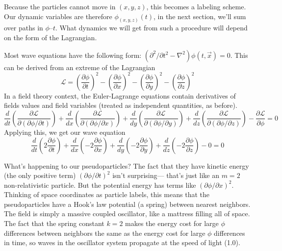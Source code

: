 \documentclass[12pt]{article}
\begin{document}
Because the particles cannot move in $(x,y,z)$, this becomes a
labeling scheme.  Our dynamic variables are therefore
$\phi_{(x,y,z)}(t)$, in the next section, we'll sum over paths in
$\phi$--$t$.  What dynamics we will get from such a procedure will
depend on the form of the Lagrangian.

Most wave equations have the following form: $(\partial^2/\partial t^2
- \nabla^2) \phi(t,\vec{x}) = 0$.  This can be derived from an extreme
of the Lagrangian
\begin{equation}
  \mathcal{L} = \left( \frac{\partial \phi}{\partial t} \right)^2 -
  \left( \frac{\partial \phi}{\partial x} \right)^2 - \left(
  \frac{\partial \phi}{\partial y} \right)^2 - \left( \frac{\partial
  \phi}{\partial z} \right)^2
\end{equation}
In a field theory context, the Euler-Lagrange equations contain
derivatives of fields values and field variables (treated as
independent quantities, as before).
\begin{equation}
  \frac{d}{dt} \left( \frac{\partial \mathcal{L}}{\partial (\partial \phi / \partial t)} \right) +
  \frac{d}{dx} \left( \frac{\partial \mathcal{L}}{\partial (\partial \phi / \partial x)} \right) +
  \frac{d}{dy} \left( \frac{\partial \mathcal{L}}{\partial (\partial \phi / \partial y)} \right) +
  \frac{d}{dz} \left( \frac{\partial \mathcal{L}}{\partial (\partial \phi / \partial z)} \right) -
  \frac{\partial \mathcal{L}}{\partial \phi} = 0
\end{equation}
Applying this, we get our wave equation
\begin{equation}
  \frac{d}{dt} \left(2 \frac{\partial \phi}{\partial t} \right) +
  \frac{d}{dx} \left(-2 \frac{\partial \phi}{\partial x} \right) +
  \frac{d}{dy} \left(-2 \frac{\partial \phi}{\partial y} \right) +
  \frac{d}{dz} \left(-2 \frac{\partial \phi}{\partial z} \right) - 0 = 0
\end{equation}

What's happening to our pseudoparticles?  The fact that they have
kinetic energy (the only positive term) $(\partial \phi / \partial
t)^2$ isn't surprising--- that's just like an $m=2$ non-relativistic
particle.  But the potential energy has terms like $(\partial \phi /
\partial x)^2$.  Thinking of space coordinates as particle labels,
this means that the pseudoparticles have a Hook's law potential (a
spring) between nearest neighbors.  The field is simply a massive
coupled oscillator, like a mattress filling all of space.  The fact
that the spring constant $k=2$ makes the energy cost for large $\phi$
differences between neighbors the same as the energy cost for large
$\phi$ differences in time, so waves in the oscillator system
propagate at the speed of light (1.0).
\end{document}
